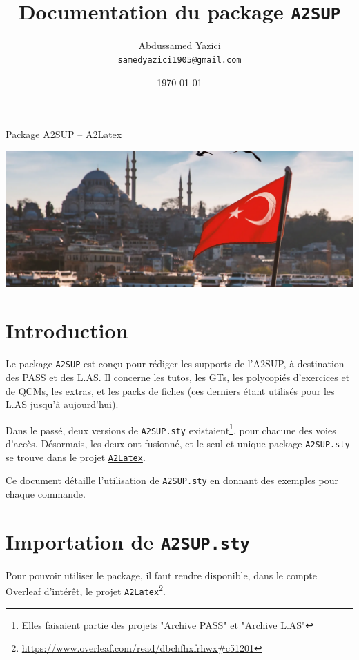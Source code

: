 \documentclass[a4paper,11pt]{article}
\begin{document}
\title{\textbf{Documentation du package \texttt{A2SUP}}}
\author{Abdussamed Yazici \\
\vspace{0.5em}
\small \texttt{samedyazici1905@gmail.com}}
\date{\today}

\maketitle

\medskip

\begin{center}
    \href{https://www.overleaf.com/read/dbchfhxfrhwx#c51201}{Package A2SUP -- A2Latex}
\end{center}

\begin{center}
    \includegraphics[width=0.5\linewidth]{img/Turquie.png}
\end{center}



\tableofcontents
\newpage


\section{Introduction}
Le package \texttt{A2SUP} est conçu pour rédiger les supports de l'A2SUP, à destination des PASS et des L.AS. Il concerne les tutos, les GTs, les polycopiés d'exercices et de QCMs, les extras, et les packs de fiches (ces derniers étant utilisés pour les L.AS jusqu'à aujourd'hui).

Dans le passé, deux versions de \texttt{A2SUP.sty} existaient\footnote{Elles faisaient partie des projets "Archive PASS" et "Archive L.AS"}, pour chacune des voies d'accès. Désormais, les deux ont fusionné, et le seul et unique package \texttt{A2SUP.sty} se trouve dans le projet \href{https://www.overleaf.com/read/dbchfhxfrhwx#c51201}{\texttt{A2Latex}}.

Ce document détaille l'utilisation de \texttt{A2SUP.sty} en donnant des exemples pour chaque commande.





\section{Importation de \texttt{A2SUP.sty}}\label{Importation}
Pour pouvoir utiliser le package, il faut rendre disponible, dans le compte Overleaf d'intérêt, le projet \href{https://www.overleaf.com/read/dbchfhxfrhwx#c51201}{\texttt{A2Latex}}\footnote{\url{https://www.overleaf.com/read/dbchfhxfrhwx\#c51201}}.\\
\end{document}

